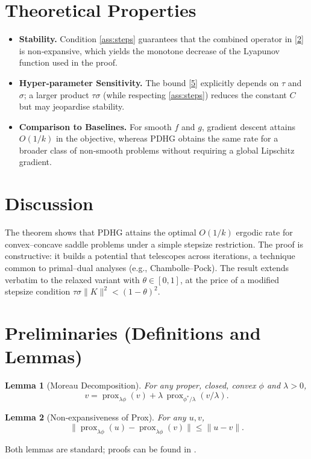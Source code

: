 \documentclass{article}
\newtheorem{lemma}{Lemma}
\newcommand{\prox}[2]{\operatorname{prox}_{#1}\!\left(#2\right)}
\begin{document}
\section*{Theoretical Properties}
\begin{itemize}
\item \textbf{Stability.} Condition \eqref{ass:steps} guarantees that the combined operator in \eqref{2} is non‑expansive, which yields the monotone decrease of the Lyapunov function used in the proof.
\item \textbf{Hyper‑parameter Sensitivity.} The bound \eqref{5} explicitly depends on $\tau$ and $\sigma$; a larger product $\tau\sigma$ (while respecting \eqref{ass:steps}) reduces the constant $C$ but may jeopardise stability.
\item \textbf{Comparison to Baselines.} For smooth $f$ and $g$, gradient descent attains $O(1/k)$ in the objective, whereas PDHG obtains the same rate for a broader class of non‑smooth problems without requiring a global Lipschitz gradient.
\end{itemize}

\section*{Discussion}
The theorem shows that PDHG attains the optimal $O(1/k)$ ergodic rate for convex–concave saddle problems under a simple stepsize restriction. The proof is constructive: it builds a potential that telescopes across iterations, a technique common to primal–dual analyses (e.g., Chambolle–Pock). The result extends verbatim to the relaxed variant with $\theta\in[0,1]$, at the price of a modified stepsize condition $\tau\sigma\|K\|^{2}< (1-\theta)^{2}$.

\section*{Preliminaries (Definitions and Lemmas)}
\begin{lemma}[Moreau Decomposition]\label{lem:moreau}
For any proper, closed, convex $\phi$ and $\lambda>0$,
\[
v = \prox{\lambda\phi}{v} + \lambda\,\prox{\phi^{*}/\lambda}{v/\lambda}.
\tag{7}
\]
\end{lemma}
\begin{lemma}[Non‑expansiveness of Prox]\label{lem:nonexp}
For any $u,v$,
\[
\bigl\|\prox{\lambda\phi}{u}-\prox{\lambda\phi}{v}\bigr\|
\le \|u-v\|.
\tag{8}
\]
\end{lemma}
Both lemmas are standard; proofs can be found in \cite{Combettes2011}.
\end{document}
